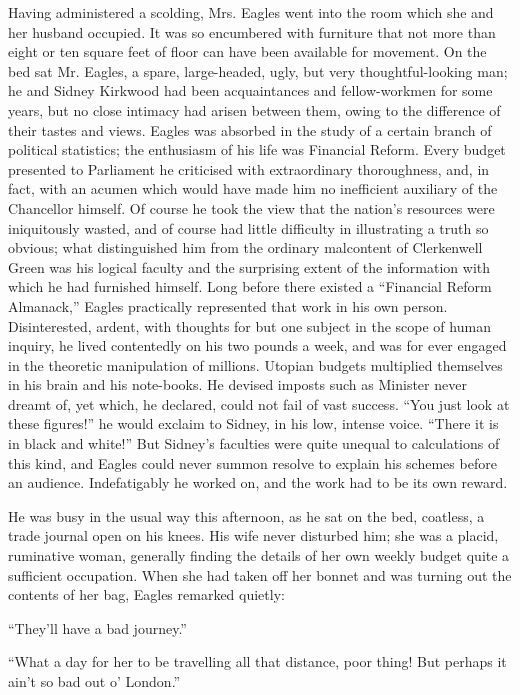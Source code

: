 Having administered a scolding, Mrs. Eagles went into the room which she
and her husband occupied. It was so encumbered with furniture that not
more than eight or ten square feet of floor can have been available for
movement. On the bed sat Mr. Eagles, a spare, large-headed, ugly, but
very thoughtful-looking man; he and Sidney Kirkwood had been
acquaintances and fellow-workmen for some years, but no close intimacy
had arisen between them, owing to the difference of their tastes and
views. Eagles was absorbed in the study of a certain branch of political
statistics; the enthusiasm of his life was Financial Reform. Every
budget presented to Parliament he criticised with extraordinary
thoroughness, and, in fact, with an acumen which would have made him no
inefficient auxiliary of the Chancellor himself. Of course he took the
view that the nation's resources were iniquitously wasted, and of course
had little difficulty in illustrating a truth so
{\protect\hypertarget{293}{}{}}obvious; what distinguished him from the
ordinary malcontent of Clerkenwell Green was his logical faculty and the
surprising extent of the information with which he had furnished
himself. Long before there existed a ``Financial Reform Almanack,''
Eagles practically represented that work in his own person.
Disinterested, ardent, with thoughts for but one subject in the scope of
human inquiry, he lived contentedly on his two pounds a week, and was
for ever engaged in the theoretic manipulation of millions. Utopian
budgets multiplied themselves in his brain and his note-books. He
devised imposts such as Minister never dreamt of, yet which, he
declared, could not fail of vast success. ``You just look at these
figures!'' he would exclaim to Sidney, in his low, intense voice.
``There it is in black and white!'' But Sidney's faculties were quite
unequal to calculations of this kind, and Eagles could never summon
resolve to explain his schemes before an audience. Indefatigably he
worked on, and the work had to be its own reward.

{\protect\hypertarget{294}{}{}}He was busy in the usual way this
afternoon, as he sat on the bed, coatless, a trade journal open on his
knees. His wife never disturbed him; she was a placid, ruminative woman,
generally finding the details of her own weekly budget quite a
sufficient occupation. When she had taken off her bonnet and was turning
out the contents of her bag, Eagles remarked quietly:

``They'll have a bad journey.''

``What a day for her to be travelling all that distance, poor thing! But
perhaps it ain't so bad out o' London.''

